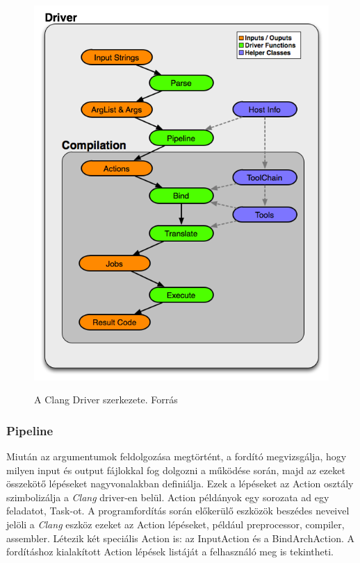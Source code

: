 \documentclass[a4paper,12pt]{report}
\begin{document}
\begin{figure}[h]
\caption{A Clang Driver szerkezete. Forrás \cite{clangdriverimage}}
\centering
\includegraphics[scale=0.6]{DriverArchitecture.png}
\label{fig:clangdriver}
\end{figure}

\subsubsection{Pipeline}
Miután az argumentumok feldolgozása megtörtént, a fordító megvizsgálja, hogy milyen input és output fájlokkal fog dolgozni a működése során, majd az ezeket összekötő lépéseket nagyvonalakban definiálja. Ezek a lépéseket az Action osztály szimbolizálja a \emph{Clang} driver-en belül. Action példányok egy sorozata ad egy feladatot, Task-ot. A programfordítás során előkerülő eszközök beszédes neveivel jelöli a \emph{Clang} eszköz ezeket az Action lépéseket, például preprocessor, compiler, assembler. Létezik két speciális Action is: az InputAction és a BindArchAction. A fordításhoz kialakított Action lépések listáját a felhasználó meg is tekintheti.
\end{document}
